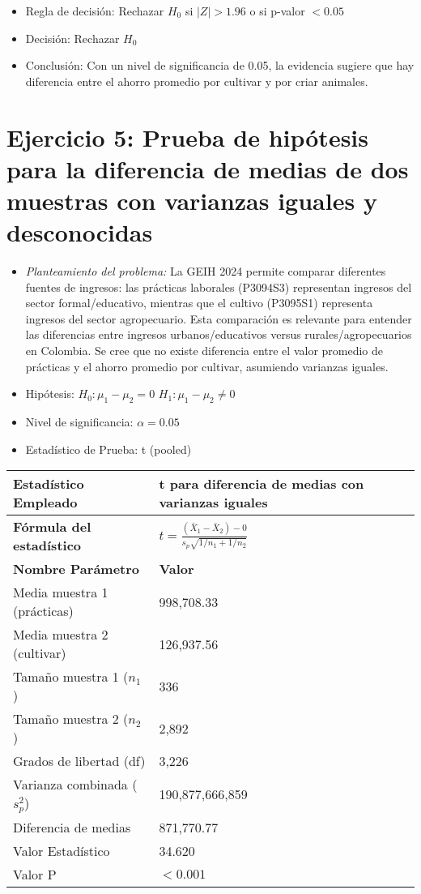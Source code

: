 \documentclass[12pt,a4paper]{article}
\begin{document}
\begin{itemize}
    \item Regla de decisión: Rechazar $H_0$ si $|Z| > 1.96$ o si p-valor $< 0.05$
    \item Decisión: Rechazar $H_0$
    \item Conclusión: Con un nivel de significancia de 0.05, la evidencia sugiere que hay diferencia entre el ahorro promedio por cultivar y por criar animales.
\end{itemize}

\section*{Ejercicio 5: Prueba de hipótesis para la diferencia de medias de dos muestras con varianzas iguales y desconocidas}
\begin{itemize}
    \item \textit{Planteamiento del problema:} La GEIH 2024 permite comparar diferentes fuentes de ingresos: las prácticas laborales (P3094S3) representan ingresos del sector formal/educativo, mientras que el cultivo (P3095S1) representa ingresos del sector agropecuario. Esta comparación es relevante para entender las diferencias entre ingresos urbanos/educativos versus rurales/agropecuarios en Colombia. Se cree que no existe diferencia entre el valor promedio de prácticas y el ahorro promedio por cultivar, asumiendo varianzas iguales.
    \item Hipótesis: \quad $H_{0}: \mu_1 - \mu_2 = 0$ \hspace{2cm} $H_{1}: \mu_1 - \mu_2 \neq 0$
    \item Nivel de significancia: $\alpha = 0.05$
    \item Estadístico de Prueba: t (pooled)
\end{itemize}

\begin{tabular}{|m{7cm}|m{7cm}|}
\hline
\textbf{Estadístico Empleado} & t para diferencia de medias con varianzas iguales \\ \hline
\textbf{Fórmula del estadístico} & $t = \frac{(\bar{X}_1 - \bar{X}_2) - 0}{s_p\sqrt{1/n_1 + 1/n_2}}$ \\ \hline
\textbf{Nombre Parámetro} & \textbf{Valor} \\ \hline
Media muestra 1 (prácticas) & 998,708.33 \\ \hline
Media muestra 2 (cultivar) & 126,937.56 \\ \hline
Tamaño muestra 1 ($n_1$) & 336 \\ \hline
Tamaño muestra 2 ($n_2$) & 2,892 \\ \hline
Grados de libertad (df) & 3,226 \\ \hline
Varianza combinada ($s_p^2$) & 190,877,666,859 \\ \hline
Diferencia de medias & 871,770.77 \\ \hline
Valor Estadístico & 34.620 \\ \hline
Valor P & $< 0.001$ \\ \hline
\end{tabular}
\end{document}
